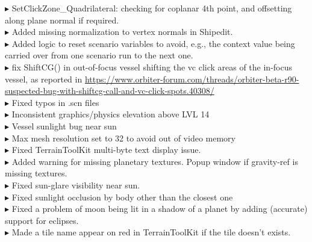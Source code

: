 \documentclass[Orbiter User Manual.tex]{subfiles}
\begin{document}
$\blacktriangleright$ SetClickZone\_Quadrilateral: checking for coplanar 4th point, and offsetting along plane normal if required.\\
$\blacktriangleright$ Added missing normalization to vertex normals in Shipedit.\\
$\blacktriangleright$ Added logic to reset scenario variables to avoid, e.g., the context value being carried over from one scenario run to the next one.\\
$\blacktriangleright$ fix ShiftCG() in out-of-focus vessel shifting the vc click areas of the in-focus vessel, as reported in \url{https://www.orbiter-forum.com/threads/orbiter-beta-r90-suspected-bug-with-shiftcg-call-and-vc-click-spots.40308/}\\
$\blacktriangleright$ Fixed typos in .scn files\\
$\blacktriangleright$ Inconsistent graphics/physics elevation above LVL 14\\
$\blacktriangleright$ Vessel sunlight bug near sun\\
$\blacktriangleright$ Max mesh resolution set to 32 to avoid out of video memory\\
$\blacktriangleright$ Fixed TerrainToolKit multi-byte text display issue.\\
$\blacktriangleright$ Added warning for missing planetary textures. Popup window if gravity-ref is missing textures.\\
$\blacktriangleright$ Fixed sun-glare visibility near sun.\\
$\blacktriangleright$ Fixed sunlight occlusion by body other than the closest one\\
$\blacktriangleright$ Fixed a problem of moon being lit in a shadow of a planet by adding (accurate) support for eclipses.\\
$\blacktriangleright$ Made a tile name appear on red in TerrainToolKit if the tile doesn't exists.\\
\end{document}
